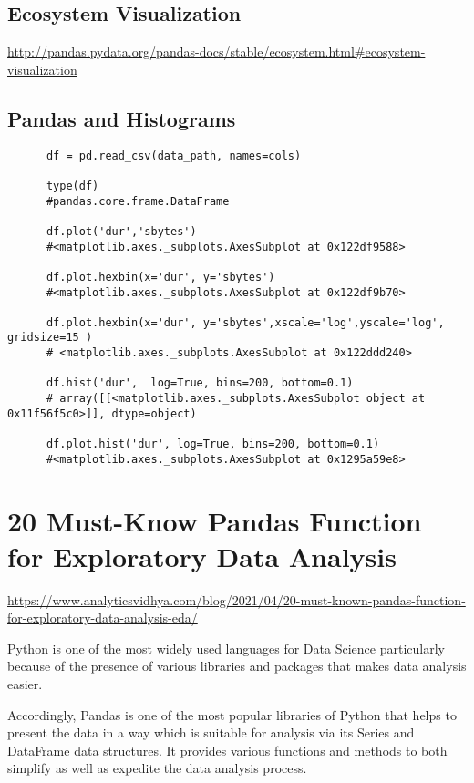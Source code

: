 \documentclass[11pt,a4paper]{article}
\begin{document}
    \subsection{Ecosystem Visualization}
    \href{http://pandas.pydata.org/pandas-docs/stable/ecosystem.html#ecosystem-visualization}{http://pandas.pydata.org/pandas-docs/stable/ecosystem.html\#ecosystem-visualization}\\ 



    \subsection{Pandas and Histograms}
    \begin{lstlisting}
      df = pd.read_csv(data_path, names=cols)

      type(df)
      #pandas.core.frame.DataFrame

      df.plot('dur','sbytes')
      #<matplotlib.axes._subplots.AxesSubplot at 0x122df9588>

      df.plot.hexbin(x='dur', y='sbytes')
      #<matplotlib.axes._subplots.AxesSubplot at 0x122df9b70>
      
      df.plot.hexbin(x='dur', y='sbytes',xscale='log',yscale='log', gridsize=15 )
      # <matplotlib.axes._subplots.AxesSubplot at 0x122ddd240>

      df.hist('dur',  log=True, bins=200, bottom=0.1) 
      # array([[<matplotlib.axes._subplots.AxesSubplot object at 0x11f56f5c0>]], dtype=object)
      
      df.plot.hist('dur', log=True, bins=200, bottom=0.1) 
      #<matplotlib.axes._subplots.AxesSubplot at 0x1295a59e8>
    \end{lstlisting}


\newpage
\section{20 Must-Know Pandas Function for Exploratory Data Analysis}
\href{https://www.analyticsvidhya.com/blog/2021/04/20-must-known-pandas-function-for-exploratory-data-analysis-eda/}{https://www.analyticsvidhya.com/blog/2021/04/20-must-known-pandas-function-for-exploratory-data-analysis-eda/}

\noindent
Python is one of the most widely used languages for Data Science particularly because of the presence of various libraries and packages that makes data analysis easier.

\smallskip \smallskip
\noindent
Accordingly, Pandas is one of the most popular libraries of Python that helps to present the data in a way which is suitable for analysis via its Series and DataFrame data structures. It provides various functions and methods to both simplify as well as expedite the data analysis process.
\end{document}
